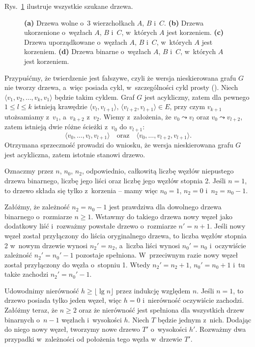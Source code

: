 
\exercise %
Rys.\ \ref{fig:B.5-1} ilustruje wszystkie szukane drzewa.
\begin{figure}[!ht]
	\centering 
	\caption{{\sffamily\bfseries(a)} Drzewa wolne o~3 wierzchołkach $A$, $B$ i~$C$.
{\sffamily\bfseries(b)} Drzewa ukorzenione o~węzłach $A$, $B$ i~$C$, w~których $A$ jest korzeniem.
{\sffamily\bfseries(c)} Drzewa uporządkowane o~węzłach $A$, $B$ i~$C$, w~których $A$ jest korzeniem.
{\sffamily\bfseries(d)} Drzewa binarne o~węzłach $A$, $B$ i~$C$, w~których $A$ jest korzeniem.} \label{fig:B.5-1}
\end{figure}

\exercise %
Przypuśćmy, że twierdzenie jest fałszywe, czyli że wersja nieskierowana grafu $G$ nie tworzy drzewa, a~więc posiada cykl, w~szczególności cykl prosty ().
Niech $\langle v_1,v_2,\dots,v_k,v_1\rangle$ będzie takim cyklem.
Graf $G$ jest acykliczny, zatem dla pewnego $1\le l\le k$ istnieją krawędzie $\langle v_l,v_{l+1}\rangle$, $\langle v_{l+2},v_{l+1}\rangle\in E$, przy czym $v_{k+1}$ utożsamiamy z~$v_1$, a~$v_{k+2}$ z~$v_2$.
Wiemy z~założenia, że $v_0\leadsto v_l$ oraz $v_0\leadsto v_{l+2}$, zatem istnieją dwie różne ścieżki z~$v_0$ do $v_{l+1}$:
\[
	\langle v_0,\dots,v_l,v_{l+1}\rangle \quad\text{oraz}\quad \langle v_0,\dots,v_{l+2},v_{l+1}\rangle.
\]
Otrzymana sprzeczność prowadzi do wniosku, że wersja nieskierowana grafu $G$ jest acykliczna, zatem istotnie stanowi drzewo.

\exercise %
Oznaczmy przez $n$, $n_0$, $n_2$, odpowiednio, całkowitą liczbę węzłów niepustego drzewa binarnego, liczbę jego liści oraz liczbę jego węzłów stopnia 2.
Jeśli $n=1$, to drzewo składa się tylko z~korzenia -- mamy więc $n_0=1$, $n_2=0$ i~$n_2=n_0-1$.

Załóżmy, że zależność $n_2=n_0-1$ jest prawdziwa dla dowolnego drzewa binarnego o~rozmiarze $n\ge1$.
Wstawmy do takiego drzewa nowy węzeł jako dodatkowy liść i~rozważmy powstałe drzewo o~rozmiarze $n'=n+1$.
Jeśli nowy węzeł został przyłączony do liścia oryginalnego drzewa, to liczba węzłów stopnia 2 w~nowym drzewie wynosi $n_2'=n_2$, a~liczba liści wynosi $n_0'=n_0$ i~oczywiście zależność $n_2'=n_0'-1$ pozostaje spełniona.
W~przeciwnym razie nowy węzeł został przyłączony do węzła o~stopniu 1.
Wtedy $n_2'=n_2+1$, $n_0'=n_0+1$ i~tu także zachodzi $n_2'=n_0'-1$.

\exercise %
Udowodnimy nierówność $h\ge\lfloor\lg n\rfloor$ przez indukcję względem $n$.
Jeśli $n=1$, to drzewo posiada tylko jeden węzeł, więc $h=0$ i~nierówność oczywiście zachodzi.
Załóżmy teraz, że $n\ge2$ oraz że nierówność jest spełniona dla wszystkich drzew binarnych o~$n-1$ węzłach i~wysokości $h$.
Niech $T$ będzie jednym z~nich.
Dodając do niego nowy węzeł, tworzymy nowe drzewo $T'$ o~wysokości $h'$.
Rozważmy dwa przypadki w~zależności od położenia tego węzła w~drzewie $T'$.

